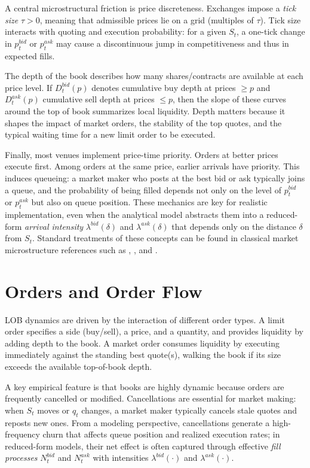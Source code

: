\documentclass[a4paper,10pt,titlepage,oneside,openany]{book}
\newcommand{\textcite}[1]{\cite{#1}}
\theoremstyle{plain}\newtheorem{theorem}{Theorem}[chapter]
\theoremstyle{definition}\newtheorem{definition}{Definition}[chapter]
\theoremstyle{remark}\newtheorem{remark}{Remark}[chapter]
\begin{document}
A central microstructural friction is price discreteness. Exchanges impose a \emph{tick size} $\tau>0$, meaning that admissible prices lie on a grid (multiples of $\tau$). Tick size interacts with quoting and execution probability: for a given $S_t$, a one-tick change in $p_t^{bid}$ or $p_t^{ask}$ may cause a discontinuous jump in competitiveness and thus in expected fills.

The depth of the book describes how many shares/contracts are available at each price level. If $D_t^{bid}(p)$ denotes cumulative buy depth at prices $\ge p$ and $D_t^{ask}(p)$ cumulative sell depth at prices $\le p$, then the slope of these curves around the top of book summarizes local liquidity. Depth matters because it shapes the impact of market orders, the stability of the top quotes, and the typical waiting time for a new limit order to be executed.

Finally, most venues implement price-time priority. Orders at better prices execute first. Among orders at the same price, earlier arrivals have priority. This induces queueing: a market maker who posts at the best bid or ask typically joins a queue, and the probability of being filled depends not only on the level of $p_t^{bid}$ or $p_t^{ask}$ but also on queue position. These mechanics are key for realistic implementation, even when the analytical model abstracts them into a reduced-form \emph{arrival intensity} $\lambda^{bid}(\delta)$ and $\lambda^{ask}(\delta)$ that depends only on the distance $\delta$ from $S_t$. Standard treatments of these concepts can be found in classical market microstructure references such as \textcite{OHara1995}, \textcite{Harris2003}, and \textcite{Hasbrouck2007}.

\section{Orders and Order Flow}
LOB dynamics are driven by the interaction of different order types. A limit order specifies a side (buy/sell), a price, and a quantity, and provides liquidity by adding depth to the book. A market order consumes liquidity by executing immediately against the standing best quote(s), walking the book if its size exceeds the available top-of-book depth.

A key empirical feature is that books are highly dynamic because orders are frequently cancelled or modified. Cancellations are essential for market making: when $S_t$ moves or $q_t$ changes, a market maker typically cancels stale quotes and reposts new ones. From a modeling perspective, cancellations generate a high-frequency churn that affects queue position and realized execution rates; in reduced-form models, their net effect is often captured through effective \emph{fill processes} $N_t^{bid}$ and $N_t^{ask}$ with intensities $\lambda^{bid}(\cdot)$ and $\lambda^{ask}(\cdot)$.
\end{document}
